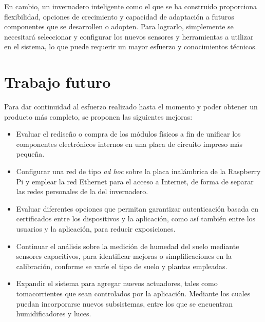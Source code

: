 En cambio, un invernadero inteligente como el que se ha construido proporciona flexibilidad, opciones de crecimiento y capacidad de adaptación a futuros componentes que se desarrollen o adopten. Para lograrlo, simplemente se necesitará seleccionar y configurar los nuevos sensores y herramientas a utilizar en el sistema, lo que puede requerir un mayor esfuerzo y conocimientos técnicos.






\section{Trabajo futuro}

Para dar continuidad al esfuerzo realizado hasta el momento y poder obtener un producto más completo, se proponen las siguientes mejoras:

\begin{itemize}
\item Evaluar el rediseño o compra de los módulos físicos a fin de unificar los componentes electrónicos internos en una placa de circuito impreso más pequeña. %
 
\item Configurar una red de tipo \textit{ad hoc} sobre la placa inalámbrica de la Raspberry Pi y emplear la red Ethernet para el acceso a Internet, de forma de separar las redes personales de la del invernadero.

\item Evaluar diferentes opciones que permitan garantizar autenticación basada en certificados entre los dispositivos y la aplicación, como así también entre los usuarios y la aplicación, para reducir exposiciones.

\item Continuar el análisis sobre la medición de humedad del suelo mediante sensores capacitivos, para identificar mejoras o simplificaciones en la calibración, conforme se varíe el tipo de suelo y plantas empleadas. 

\item Expandir el sistema para agregar nuevos actuadores, tales como tomacorrientes que sean controlados por la aplicación. Mediante los cuales puedan incorporarse nuevos subsistemas, entre los que se encuentran humidificadores y luces. 

\end{itemize}